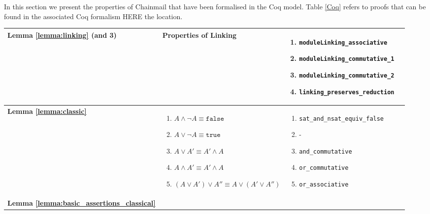  In this section we present the properties of Chainmail that have been formalised in the Coq model. Table \ref{Coq} refers to proofs that can be found in the associated Coq formalism HERE the location.

\begin{table}
  \begin{tabular}{|l|l|l|l|}
    \hline

\textbf{Lemma \ref{lemma:linking} (and 3)} &
Properties of Linking
        & 
\parbox{.45\textwidth}{\scriptsize\begin{enumerate}[label={(\arabic*)}]
            \item \texttt{moduleLinking\_associative}
            \item \texttt{moduleLinking\_commutative\_1}
            \item \texttt{moduleLinking\_commutative\_2}
            \item \texttt{linking\_preserves\_reduction}
        \end{enumerate}}
        \\
\hline
\textbf{Lemma \ref{lemma:classic}} &   
\parbox{.45\textwidth}{\scriptsize\begin{enumerate}[label={(\arabic*)}]
            \item $A \wedge \neg A \equiv \texttt{false}$
            \item $A \vee \neg A \equiv \texttt{true}$
            \item $A \vee A' \equiv A' \wedge A$
            \item $A \wedge A' \equiv A' \wedge A$
            \item $(A \vee A') \vee A'' \equiv A \vee (A' \vee A'')$
        \end{enumerate}}
        & 
\parbox{.45\textwidth}{\scriptsize\begin{enumerate}[label={(\arabic*)}]
            \item \texttt{sat\_and\_nsat\_equiv\_false}
            \item -
            \item \texttt{and\_commutative}
            \item \texttt{or\_commutative}
            \item \texttt{or\_associative}
        \end{enumerate}}
        \\
\hline
\textbf{Lemma \ref{lemma:basic_assertions_classical}} &   
\parbox{.45\textwidth}{\scriptsize\begin{enumerate}[label={(\arabic*)}]

\end{enumerate}}
\end{tabular}
\end{table}
